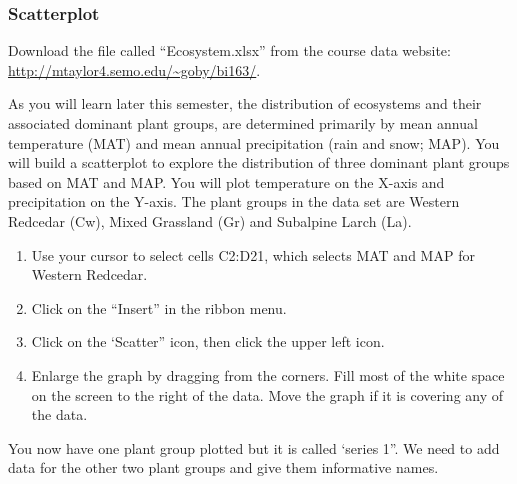 \documentclass[12pt, hidelinks]{exam}
\newcommand{\VSpace}{\vspace{\baselineskip}}
\begin{document}
\subsubsection*{Scatterplot}

Download the file called “Ecosystem.xlsx” from the course data website: \url{http://mtaylor4.semo.edu/~goby/bi163/}.\VSpace

As you will learn later this semester, the distribution of ecosystems and their associated dominant plant groups, are determined primarily by mean annual temperature (MAT) and mean annual precipitation (rain and snow; MAP). You will build a scatterplot to explore the distribution of three dominant plant groups based on MAT and MAP. You will plot temperature on the X-axis and precipitation on the Y-axis. The plant groups in the data set are Western Redcedar (Cw), Mixed Grassland (Gr) and Subalpine Larch (La). 

\begin{enumerate}
	\item Use your cursor to select cells C2:D21, which selects MAT and MAP for Western Redcedar.

	\item Click on the “Insert” in the ribbon menu.

	\item Click on the ‘Scatter” icon, then click the upper left icon.

	\item Enlarge the graph by dragging from the corners. Fill most of the white space on the screen to the right of the data. Move the graph if it is covering any of the data. 
\end{enumerate}

You now have one plant group plotted but it is called ‘series 1”. We need to add data for the other two plant groups and give them informative names. 
\end{document}
